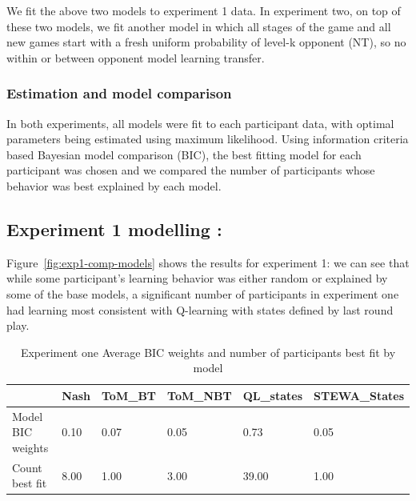 \documentclass[man,floatsintext]{apa6}
\begin{document}
We fit the above two models to experiment 1 data. In experiment two, on top of these two models, we fit another model in which all stages of the game and all new games start with a fresh uniform probability of level-k opponent (NT), so no within or between opponent model learning transfer.

\hypertarget{estimation-and-model-comparison}{%
\subsubsection{Estimation and model comparison}\label{estimation-and-model-comparison}}

In both experiments, all models were fit to each participant data, with optimal parameters being estimated using maximum likelihood. Using information criteria based Bayesian model comparison (BIC), the best fitting model for each participant was chosen and we compared the number of participants whose behavior was best explained by each model.

\hypertarget{experiment-1-modelling}{%
\subsection{Experiment 1 modelling :}\label{experiment-1-modelling}}

Figure~\ref{fig:exp1-comp-models} shows the results for experiment 1: we can see that while some participant's learning behavior was either random or explained by some of the base models, a significant number of participants in experiment one had learning most consistent with Q-learning with states defined by last round play.

\begin{table}[tbp]
\begin{center}
\begin{threeparttable}
\caption{\label{tab:exp1weightstable}Experiment one Average BIC weights and number of participants best fit by model}
\begin{tabular}{llllll}
\toprule
 & \multicolumn{1}{c}{Nash} & \multicolumn{1}{c}{ToM\_BT} & \multicolumn{1}{c}{ToM\_NBT} & \multicolumn{1}{c}{QL\_states} & \multicolumn{1}{c}{STEWA\_States}\\
\midrule
Model BIC weights & 0.10 & 0.07 & 0.05 & 0.73 & 0.05\\
Count best fit & 8.00 & 1.00 & 3.00 & 39.00 & 1.00\\
\bottomrule
\end{tabular}
\end{threeparttable}
\end{center}
\end{table}
\end{document}
